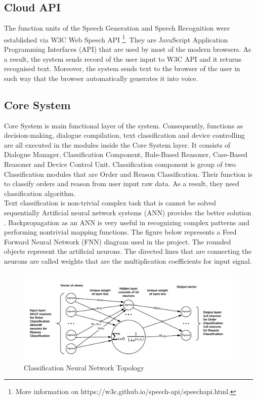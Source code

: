 \documentclass{llncs}
\begin{document}
    \subsection{Cloud API}
    The function units of the Speech Generation and Speech Recognition were established via W3C Web Speech API \footnote{More information on https://w3c.github.io/speech-api/speechapi.html.}.
    They are JavaScript Application Programming Interfaces (API) that are used by most of the modern browsers.
    As a result, the system sends record of the user input to W3C API and it returns recognised text.
    Moreover, the system sends text to the browser of the user in such way that the browser automatically generates it into voice.
    \subsection{Core System}
    Core System is main functional layer of the system.
    Consequently, functions as decision-making, dialogue compilation, text classification and device controlling are all executed in the modules inside the Core System layer.
    It consists of Dialogue Manager, Classification Component, Rule-Based Reasoner, Case-Based Reasoner and Device Control Unit.
    Classification component is group of two Classification modules that are Order and Reason Classification.
    Their function is to classify orders and reason from user input raw data.
    As a result, they need classification algorithm.\\
    Text classification is non-trivial complex task that is cannot be solved sequentially
    Artificial neural network systems (ANN) provides the better solution \cite{14}.
    Backpropagation as an ANN is very useful in recognizing complex patterns and performing nontrivial mapping functions.
    The figure below represents a Feed Forward Neural Network (FNN) diagram used in the project.
    The rounded objects represent the artificial neurons.
    The directed lines that are connecting the neurons are called weights that are the multiplication coefficients for input signal.\\
    \begin{figure}
        \includegraphics[width=\textwidth]{ANN.png}
        \caption[]{Classification Neural Network Topology}
    \end{figure}
\end{document}
